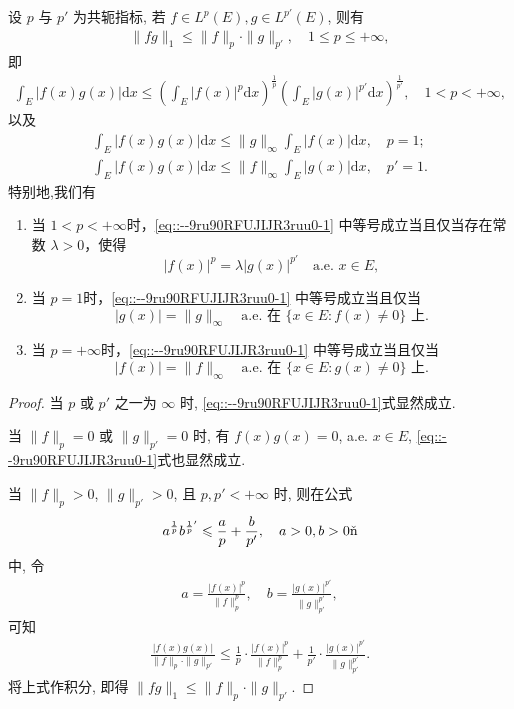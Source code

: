 \documentclass[../../main.tex]{subfiles}%
\begin{document}
\begin{theorem}[Hölder不等式]\label{theorem:实变函数--Hölder不等式}
设 $p$ 与 $p'$ 为共轭指标, 若 $f\in L^p(E), g\in L^{p'}(E)$, 则有
\begin{align}\label{eq::--9ru90RFUJIJR3ruu0-1}
\|fg\|_1 \leqslant \|f\|_p \cdot \|g\|_{p'}, \quad 1\leqslant p\leqslant +\infty,
\end{align}
即
\begin{align*}
\int_E |f(x)g(x)|\mathrm{d}x \leqslant \left( \int_E |f(x)|^p \mathrm{d}x \right)^{\frac{1}{p}} \left( \int_E |g(x)|^{p'} \mathrm{d}x \right)^{\frac{1}{p'}}, \quad 1<p<+\infty,
\end{align*}
以及
\begin{gather*}
\int_E |f(x)g(x)|\mathrm{d}x \leqslant \|g\|_\infty \int_E |f(x)|\mathrm{d}x, \quad p=1;\\
\int_E |f(x)g(x)|\mathrm{d}x \leqslant \|f\|_\infty \int_E |g(x)|\mathrm{d}x, \quad p'=1.
\end{gather*}
特别地,我们有
\begin{enumerate}[(1)]
\item 当 $1<p<+\infty$时，\eqref{eq::--9ru90RFUJIJR3ruu0-1} 中等号成立当且仅当存在常数 $\lambda>0$，使得
\[
|f(x)|^p = \lambda |g(x)|^{p'} \quad \text{a.e. } x\in E,
\]

\item 当 $p=1$时，\eqref{eq::--9ru90RFUJIJR3ruu0-1} 中等号成立当且仅当
\[
|g(x)|=\|g\|_\infty \quad \text{a.e. 在 } \{x\in E: f(x)\neq 0\}\text{ 上}.
\]

\item 当 $p=+\infty$时，\eqref{eq::--9ru90RFUJIJR3ruu0-1} 中等号成立当且仅当
\[
|f(x)|=\|f\|_\infty \quad \text{a.e. 在 } \{x\in E: g(x)\neq 0\}\text{ 上}.
\]
\end{enumerate}
\end{theorem}
\begin{proof}

当 $p$ 或 $p'$ 之一为 $\infty$ 时, \eqref{eq::--9ru90RFUJIJR3ruu0-1}式显然成立.

当 $\|f\|_p=0$ 或 $\|g\|_{p'}=0$ 时, 有 $f(x)g(x)=0$, a.e. $x\in E$, \eqref{eq::--9ru90RFUJIJR3ruu0-1}式也显然成立.

当 $\|f\|_p>0$, $\|g\|_{p'}>0$, 且 $p,p'<+\infty$ 时, 则在公式
\begin{align*}
a^{\frac{1}{p}}b^{\frac{1}{p}'}\leqslant \frac{a}{p}+\frac{b}{p'}, \quad a>0, b>0 \one
\end{align*}
中, 令
\begin{align*}
a=\frac{|f(x)|^p}{\|f\|_p^p}, \quad b=\frac{|g(x)|^{p'}}{\|g\|_{p'}^{p'}},
\end{align*}
可知
\begin{align*}
\frac{|f(x)g(x)|}{\|f\|_p \cdot \|g\|_{p'}} \leqslant \frac{1}{p} \cdot \frac{|f(x)|^p}{\|f\|_p^p} + \frac{1}{p'} \cdot \frac{|g(x)|^{p'}}{\|g\|_{p'}^{p'}}.
\end{align*}
将上式作积分, 即得 $\|fg\|_1\leqslant \|f\|_p \cdot \|g\|_{p'}$.
\end{proof}
\end{document}

